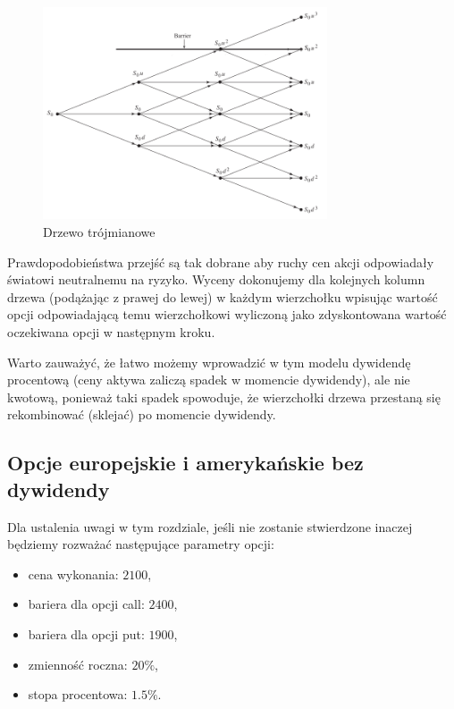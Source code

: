 \documentclass[12pt]{article}
\begin{document}
\begin{figure}[H]
    \centering
    \includegraphics[width=0.75\textwidth,height=\textheight,keepaspectratio]{tbt.png}
    \caption{Drzewo trójmianowe}
    \label{fig:tbt}
\end{figure}

Prawdopodobieństwa przejść są tak dobrane aby ruchy cen akcji odpowiadały światowi neutralnemu na ryzyko. Wyceny dokonujemy dla kolejnych kolumn drzewa (podążając z prawej do lewej) w każdym wierzchołku wpisując wartość opcji odpowiadającą temu wierzchołkowi wyliczoną jako zdyskontowana wartość oczekiwana opcji w następnym kroku. 

Warto zauważyć, że łatwo możemy wprowadzić w tym modelu dywidendę procentową (ceny aktywa zaliczą spadek w momencie dywidendy), ale nie kwotową, ponieważ taki spadek spowoduje, że wierzchołki drzewa przestaną się rekombinować (sklejać) po momencie dywidendy.

\subsection{Opcje europejskie i amerykańskie bez dywidendy}

Dla ustalenia uwagi w tym rozdziale, jeśli nie zostanie stwierdzone inaczej będziemy rozważać następujące parametry opcji: 
\begin{itemize}
    \item cena wykonania: \(2100\),
    \item bariera dla opcji call: \(2400\),
    \item bariera dla opcji put: \(1900\),
    \item zmienność roczna: \(20\%\),
    \item stopa procentowa: \(1.5\%\).
\end{itemize}
\end{document}
